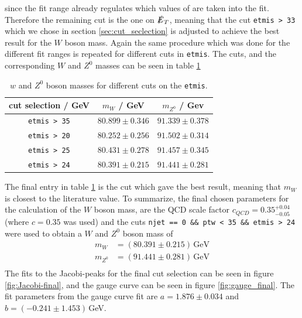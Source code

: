     since the fit range already regulates which values of  are taken into the fit. Therefore the remaining cut is the one on $\slashed{E}_T$, meaning that the cut 
    \texttt{etmis > 33} which we chose in section \ref{sec:cut_seclection} is adjusted to achieve the best result for the $W$ boson mass.
    Again the same procedure which was done for the different fit ranges is repeated for different cuts in \texttt{etmis}. The cuts, and the corresponding $W$ and $Z^0$ masses
    can be seen in table \ref{tab:etmis}
    \begin{table}[H]
        \centering
        \begin{tabular}{ccc}
            \toprule
            cut selection / GeV & $m_W$ / GeV & $m_{Z^0}$ / Gev \\
            \midrule
            \texttt{etmis > 35}     & $80.899 \pm 0.346$  &  $91.339 \pm 0.378$ \\
            \texttt{etmis > 20}     & $80.252 \pm 0.256$  &  $91.502 \pm 0.314$ \\
            \texttt{etmis > 25}     & $80.431 \pm 0.278$  &  $91.457 \pm 0.345$ \\
            \texttt{etmis > 24}     & $80.391 \pm 0.215$  &  $91.441 \pm 0.281$ \\
            \bottomrule
        \end{tabular}
        \caption{$w$ and $Z^0$ boson masses for different cuts on the \texttt{etmis}.}
        \label{tab:etmis}
    \end{table}
    The final entry in table \ref{tab:etmis} is the cut which gave the best result, meaning that $m_W$ is closest to the literature value.
    To summarize, the final chosen parameters for the calculation of the $W$ boson mass, are the QCD scale factor $c_{QCD} = 0.35_{-0.05}^{+0.04}$ (where $c=0.35$ was used)
    and the cuts \texttt{njet == 0 \&\& ptw < 35 \&\& etmis > 24} were used to obtain a $W$ and $Z^0$ boson mass of 
    \begin{align*}
        m_W  & = (80.391 \pm 0.215)\,\mathrm{GeV}  \\
        m_{Z^0} & = (91.441 \pm 0.281)\,\mathrm{GeV} \\
    \end{align*}
    The fits to the Jacobi-peaks for the final cut selection can be seen in figure \ref{fig:Jacobi-final}, and the gauge curve can be seen in figure \ref{fig:gauge_final}.
    The fit parameters from the gauge curve fit are $a=1.876 \pm 0.034$ and $b = (-0.241 \pm 1.453)$\,GeV.


